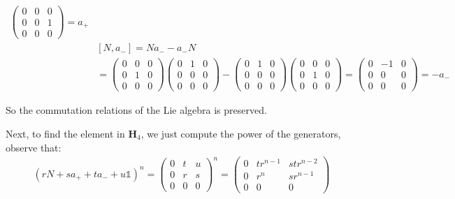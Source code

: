 \documentclass[]{ctexart}
\begin{document}
\begin{equation*}
\begin{aligned}
\begin{pmatrix}
			0 & 0 & 0 \\
			0 & 0 & 1 \\
			0 & 0 & 0
			\end{pmatrix}=a_+\\
			&\left[N,a_-\right]=Na_--a_-N\\
			&=
			\begin{pmatrix}
			0 & 0 & 0 \\
			0 & 1 & 0 \\
			0 & 0 & 0
			\end{pmatrix}
			\begin{pmatrix}
			0 & 1 & 0 \\
			0 & 0 & 0 \\
			0 & 0 & 0
			\end{pmatrix}
			-
			\begin{pmatrix}
			0 & 1 & 0 \\
			0 & 0 & 0 \\
			0 & 0 & 0
			\end{pmatrix}
			\begin{pmatrix}
			0 & 0 & 0 \\
			0 & 1 & 0 \\
			0 & 0 & 0
			\end{pmatrix}
			=
			\begin{pmatrix}
			0 & -1 & 0 \\
			0 & 0 &  0\\
			0 & 0 & 0
			\end{pmatrix}=-a_-
			\end{aligned}
			\end{equation*}
			
		So the commutation relations of the Lie algebra is preserved. 
		
		Next, to find the element in $\mathbf{H}_4$, we just compute the power of the generators, observe that: 
			\begin{equation*}
			\begin{aligned}
				(rN+sa_++ta_-+u\mathds{1})^n=
				\begin{pmatrix}
					0 & t &  u \\
					0 & r &  s\\
					0 & 0 & 0
				\end{pmatrix}^n=
				\begin{pmatrix}
				0 & tr^{n-1} &  str^{n-2} \\
				0 & r^n &  sr^{n-1}\\
				0 & 0 & 0
				\end{pmatrix}
			\end{aligned}
			\end{equation*}
			
\end{document}
